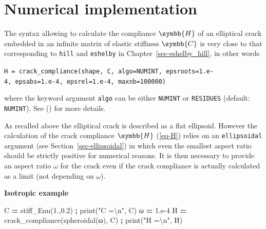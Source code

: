 \documentclass[
  a4paper,
  numbers=noendperiod,
  DIV=12]{scrreprt}
\newenvironment{Shaded}{\begin{snugshade}}{\end{snugshade}}
\newcommand{\BuiltInTok}[1]{#1}
\newcommand{\CharTok}[1]{\textcolor[rgb]{0.31,0.60,0.02}{#1}}
\newcommand{\FloatTok}[1]{\textcolor[rgb]{0.00,0.00,0.81}{#1}}
\newcommand{\NormalTok}[1]{#1}
\newcommand{\OperatorTok}[1]{\textcolor[rgb]{0.81,0.36,0.00}{\textbf{#1}}}
\newcommand{\StringTok}[1]{\textcolor[rgb]{0.31,0.60,0.02}{#1}}
\newcommand{\uuuu}[1]{{\symbb{{#1}}}}
\begin{document}
\section{Numerical implementation}\label{numerical-implementation}

The syntax allowing to calculate the compliance \(\uuuu{H}\) of an
elliptical crack embedded in an infinite matrix of elastic stiffness
\(\uuuu{C}\) is very close to that corresponding to \texttt{hill} and
\texttt{eshelby} in Chapter~\ref{sec-eshelby_hill}, in other words

\texttt{H\ =\ crack\_compliance(shape,\ C,\ algo=NUMINT,\ epsroots=1.e-4,\ epsabs=1.e-4,\ epsrel=1.e-4,\ maxnb=100000)}

where the keyword argument \texttt{algo} can be either \texttt{NUMINT}
or \texttt{RESIDUES} (default: \texttt{NUMINT}). See
() for more
details.

\begin{tcolorbox}[enhanced jigsaw, arc=.35mm, bottomrule=.15mm, bottomtitle=1mm, breakable, colback=white, colbacktitle=quarto-callout-warning-color!10!white, colframe=quarto-callout-warning-color-frame, coltitle=black, left=2mm, leftrule=.75mm, opacityback=0, opacitybacktitle=0.6, rightrule=.15mm, title=\textcolor{quarto-callout-warning-color}{\faExclamationTriangle}\hspace{0.5em}{Warning}, titlerule=0mm, toprule=.15mm, toptitle=1mm]

As recalled above the elliptical crack is described as a flat ellipsoid.
However the calculation of the crack compliance \(\uuuu{H}\)
(\ref{eq-H}) relies on an \texttt{ellipsoidal} argument (see
Section~\ref{sec-ellipsoidal}) in which even the smallest aspect ratio
should be strictly positive for numerical reasons. It is then necessary
to provide an aspect ratio \(\omega\) for the crack even if the crack
compliance is actually calculated as a limit (not depending on
\(\omega\)).

\end{tcolorbox}

\textbf{Isotropic example}

\begin{Shaded}
\begin{Highlighting}[]
\NormalTok{C }\OperatorTok{=}\NormalTok{ stiff\_Enu(}\FloatTok{1.}\NormalTok{,}\FloatTok{0.2}\NormalTok{) }\OperatorTok{;} \BuiltInTok{print}\NormalTok{(}\StringTok{"C =}\CharTok{\textbackslash{}n}\StringTok{"}\NormalTok{, C)}
\NormalTok{ω }\OperatorTok{=} \FloatTok{1.e{-}4}
\NormalTok{H }\OperatorTok{=}\NormalTok{ crack\_compliance(spheroidal(ω), C) }\OperatorTok{;} \BuiltInTok{print}\NormalTok{(}\StringTok{"H =}\CharTok{\textbackslash{}n}\StringTok{"}\NormalTok{, H)}
\end{Highlighting}
\end{Shaded}
\end{document}
